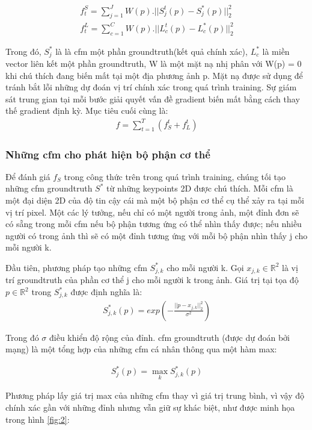 \begin{align}
	f^{S}_t =   \sum\nolimits_{j=1}^{J} W(p).||S^{t}_j(p) - S^*_j(p) ||^2_2 \\
	f^{L}_t =   \sum\nolimits_{c=1}^{C} W(p).||L^{t}_c(p) - L^*_c(p) ||^2_2
\end{align}

Trong đó, $S^*_j$ là là cfm một phần groundtruth(kết quả chính xác), $L^*_c$ là miền vector liên kết một phần groundtruth, W là một mặt nạ nhị phân với W(p) = 0 khi chú thích đang biến mất tại một địa phương ảnh p. Mặt nạ được sử dụng để tránh bắt lỗi những dự đoán vị trí chính xác trong quá trình training. Sự giám sát trung gian tại mỗi bước giải quyết vấn đề gradient biến mất bằng cách thay thế gradient định kỳ. Mục tiêu cuối cùng là:
\begin{align}
f =  \sum_{t=1}^{T}  (f^t_S + f^t_L)
\end{align}
\subsubsection{Những cfm cho phát hiện bộ phận cơ thể}

Để đánh giá $f_S$ trong công thức trên trong quá trình training, chúng tối tạo những cfm groundtruth $S^*$ từ những keypoints 2D được chú thích. Mỗi cfm là một đại diện 2D của độ tin cậy cái mà một bộ phận cơ thể cụ thể xảy ra tại mỗi vị trí pixel. Một các lý tưởng, nếu chỉ có một người trong ảnh, một đỉnh đơn sẽ có sẵng trong mỗi cfm nếu bộ phận tương ứng có thể nhìn thấy được; nếu nhiều người có trong ảnh thì sẽ có một đỉnh tương ứng với mỗi bộ phận nhìn thấy j cho mỗi người k.

Đầu tiên, phương pháp tạo những cfm $S^*_{j,k}$ cho mỗi người k. Gọi $x_{j,k}  \in  \mathbb{R}^2$ là vị trí groundtruth của phần cơ thể j cho mỗi người k trong ảnh. Giá trị tại tọa độ $p \in \mathbb{R}^2$ trong $S^*_{j,k}$ được định nghĩa là:
\begin{align}
S^*_{j,k}(p) = exp(- \frac{||p-x_{j,k}||^2_2 }{ \sigma^2} )
\end{align}

Trong đó $\sigma$ điều khiển độ rộng của đỉnh. cfm groundtruth (được dự đoán bởi mạng) là một tổng hợp của những cfm cá nhân thông qua một hàm max:

\begin{align}
S^*_j(p) =   \max_{k} S^*_{j,k}(p)
\end{align}

Phương pháp lấy giá trị max của những cfm thay vì giá trị trung bình, vì vậy độ chính xác gần với những đỉnh nhưng vẫn giữ sự khác biệt, như được minh họa trong hình \ref{fig:2}:

